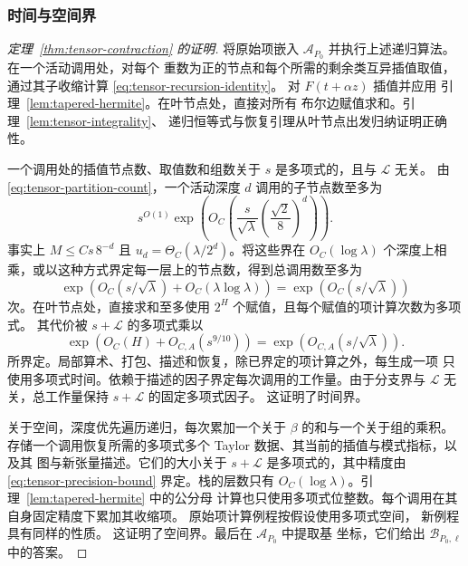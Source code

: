 \subsubsection{时间与空间界}
\label{subsec:tensor-cost}

\begin{proof}[定理~\ref{thm:tensor-contraction} 的证明]
将原始项嵌入 $\mathcal A_{P_0}$ 并执行上述递归算法。在一个活动调用处，对每个
重数为正的节点和每个所需的剩余类互异插值取值，通过其子收缩计算 \eqref{eq:tensor-recursion-identity}。
对 $F(t+\alpha z)$ 插值并应用
引理~\ref{lem:tapered-hermite}。在叶节点处，直接对所有
布尔边赋值求和。引理~\ref{lem:tensor-integrality}、
递归恒等式与恢复引理从叶节点出发归纳证明正确性。

一个调用处的插值节点数、取值数和组数关于 $s$ 是多项式的，且与 $\mathcal L$ 无关。
由 \eqref{eq:tensor-partition-count}，一个活动深度 $d$ 调用的子节点数至多为
\[
 s^{O(1)}\exp\left(
       O_C\left(\frac{s}{\sqrt\lambda}
                    \left(\frac{\sqrt2}{8}\right)^d\right)\right).
\]
事实上 $M\le Cs\,8^{-d}$ 且
$u_d=\Theta_C(\lambda/2^d)$。将这些界在
$O_C(\log\lambda)$ 个深度上相乘，或以这种方式界定每一层上的节点数，得到总调用数至多为
\[
 \exp\left(O_C(s/\sqrt\lambda)
                   +O_C(\lambda\log\lambda)\right)
       =\exp(O_C(s/\sqrt\lambda))
\]
次。在叶节点处，直接求和至多使用 $2^H$ 个赋值，且每个赋值的项计算次数为多项式。
其代价被 $s+\mathcal L$ 的多项式乘以
\[
 \exp(O_C(H)+O_{C,A}(s^{9/10}))
   =\exp(O_{C,A}(s/\sqrt\lambda)).
\]
所界定。局部算术、打包、描述和恢复，除已界定的项计算之外，每生成一项
只使用多项式时间。依赖于描述的因子界定每次调用的工作量。由于分支界与
$\mathcal L$ 无关，总工作量保持 $s+\mathcal L$ 的固定多项式因子。
这证明了时间界。

关于空间，深度优先遍历递归，每次累加一个关于 $\beta$ 的和与一个关于组的乘积。
存储一个调用恢复所需的多项式多个 Taylor 数据、其当前的插值与模式指标，以及其
图与新张量描述。它们的大小关于 $s+\mathcal L$ 是多项式的，其中精度由
\eqref{eq:tensor-precision-bound} 界定。栈的层数只有
$O_C(\log\lambda)$。引理~\ref{lem:tapered-hermite} 中的公分母
计算也只使用多项式位整数。每个调用在其自身固定精度下累加其收缩项。
原始项计算例程按假设使用多项式空间，
新例程具有同样的性质。
这证明了空间界。最后在 $\mathcal A_{P_0}$ 中提取基
坐标，它们给出 $\mathcal B_{P_0,\ell}$ 中的答案。
\end{proof}
